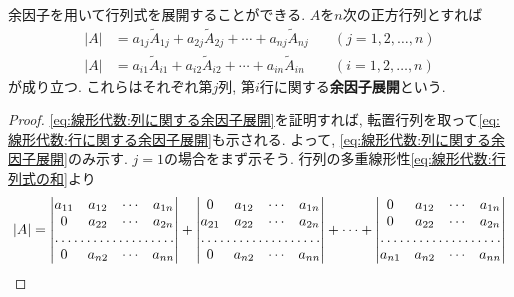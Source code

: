 \documentclass[a4j,dvipdfmx]{jsarticle}
\numberwithin{equation}{section}
\begin{document}
            余因子を用いて行列式を展開することができる. $A$を$n$次の正方行列とすれば
            \begin{align}
                |A|&=a_{1j}\tilde{A}_{1j}+a_{2j}\tilde{A}_{2j}+\cdots+a_{nj}\tilde{A}_{nj}\quad &(j=1,2,\dots,n) \label{eq:線形代数:列に関する余因子展開}\\
                |A|&=a_{i1}\tilde{A}_{i1}+a_{i2}\tilde{A}_{i2}+\cdots+a_{in}\tilde{A}_{in}\quad &(i=1,2,\dots,n) \label{eq:線形代数:行に関する余因子展開}
            \end{align}
            が成り立つ. これらはそれぞれ第$j$列, 第$i$行に関する\textbf{余因子展開}という.
            \begin{proof}
                \eqref{eq:線形代数:列に関する余因子展開}を証明すれば, 転置行列を取って\eqref{eq:線形代数:行に関する余因子展開}も示される. よって, \eqref{eq:線形代数:列に関する余因子展開}のみ示す.
                $j=1$の場合をまず示そう. 行列の多重線形性\eqref{eq:線形代数:行列式の和}より
                \begin{equation*}
                    |A|=
                    \begin{vmatrix}
                        a_{11} & a_{12} & \cdots & a_{1n}\\
                        0 & a_{22} & \cdots & a_{2n}\\
                        \hdotsfor{4}\\
                        0 & a_{n2} & \cdots & a_{nn}
                    \end{vmatrix}
                    +\begin{vmatrix}
                        0 & a_{12} & \cdots & a_{1n}\\
                        a_{21} & a_{22} & \cdots & a_{2n}\\
                        \hdotsfor{4}\\
                        0 & a_{n2} & \cdots & a_{nn}
                    \end{vmatrix}
                    +\cdots
                    +\begin{vmatrix}
                        0 & a_{12} & \cdots & a_{1n}\\
                        0 & a_{22} & \cdots & a_{2n}\\
                        \hdotsfor{4}\\
                        a_{n1} & a_{n2} & \cdots & a_{nn}
                    \end{vmatrix}

\end{equation*}
\end{proof}
\end{document}
